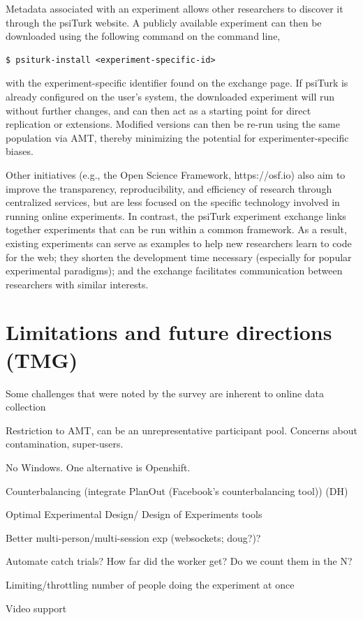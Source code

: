 \documentclass[twocolumn]{svjour3}          %
\begin{document}
Metadata associated with an experiment allows other researchers to discover it through the psiTurk website.
A publicly available experiment can then be downloaded using the following command on the command line,

\begin{lstlisting}
$ psiturk-install <experiment-specific-id>
\end{lstlisting}

\noindent with the experiment-specific identifier found on the exchange page.
If psiTurk is already configured on the user's system, the downloaded experiment will run without further changes, and can then act as a starting point for direct replication or extensions.
Modified versions can then be re-run using the same population via AMT, thereby minimizing the potential for experimenter-specific biases.

Other initiatives (e.g., the Open Science Framework, https://osf.io) also aim to improve the transparency, reproducibility, and efficiency of research through centralized services, but are less focused on the specific technology involved in running online experiments.
In contrast, the psiTurk experiment exchange links together experiments that can be run within a common framework.
As a result, existing experiments can serve as examples to help new researchers learn to code for the web; they shorten the development time necessary (especially for popular experimental paradigms); and the exchange facilitates communication between researchers with similar interests.

\section{Limitations and future directions (TMG)}

Some challenges that were noted by the survey are inherent to online data collection 

Restriction to AMT, can be an unrepresentative participant pool. Concerns about contamination, super-users. \cite{chandler2014nonnaivete}

No Windows. One alternative is Openshift.

Counterbalancing (integrate PlanOut (Facebook's counterbalancing tool)) (DH)

Optimal Experimental Design/ Design of Experiments tools

Better multi-person/multi-session exp (websockets; doug?)?

Automate catch trials? How far did the worker get? Do we count them in the N? 

Limiting/throttling number of people doing the experiment at once

Video support


\end{document}
